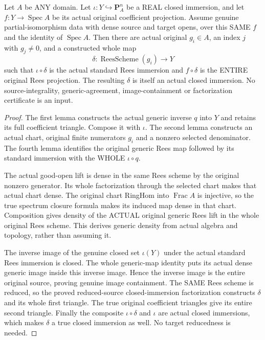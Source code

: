 \begin{theorem}
\label{scheme:actual-closed-projective-rees-domination}
Let $A$ be ANY domain. Let $\iota:Y\hookrightarrow\mathbf P^n_A$ be a REAL
closed immersion, and let $f:Y\to\operatorname{Spec}A$ be its actual original
coefficient projection. Assume genuine partial-isomorphism data with dense
source and target opens, over this SAME $f$ and the identity of
$\operatorname{Spec}A$. Then there are actual original $g_i\in A$, an index
$j$ with $g_j\ne0$, and a constructed whole map
\[
 \delta:\operatorname{ReesScheme}(g_i)\longrightarrow Y
\]
such that $\iota\circ\delta$ is the actual standard Rees immersion and
$f\circ\delta$ is the ENTIRE original Rees projection. The resulting
$\delta$ is itself an actual closed immersion. No source-integrality,
generic-agreement, image-containment or factorization certificate is an input.
\leanok
\end{theorem}
\begin{proof}
The first lemma constructs the actual generic inverse $q$ into $Y$ and retains
its full coefficient triangle. Compose it with $\iota$. The second lemma
constructs an actual chart, original finite numerators $g_i$ and a nonzero
selected denominator. The fourth lemma identifies the original generic Rees
map followed by its standard immersion with the WHOLE $\iota\circ q$.

The actual good-open lift is dense in the same Rees scheme by the original
nonzero generator. Its whole factorization through the selected chart makes
that actual chart dense. The original chart RingHom into $\operatorname{Frac}A$
is injective, so the true spectrum closure formula makes its induced map dense
in that chart. Composition gives density of the ACTUAL original generic Rees
lift in the whole original Rees scheme. This derives generic density from
actual algebra and topology, rather than assuming it.

The inverse image of the genuine closed set $\iota(Y)$ under the actual
standard Rees immersion is closed. The whole generic-map identity puts its
actual dense generic image inside this inverse image. Hence the inverse image
is the entire original source, proving genuine image containment. The SAME
Rees scheme is reduced, so the proved reduced-source closed-immersion
factorization constructs $\delta$ and its whole first triangle. The true
original coefficient triangles give its entire second triangle. Finally the
composite $\iota\circ\delta$ and $\iota$ are actual closed immersions, which
makes $\delta$ a true closed immersion as well. No target reducedness is needed.
\end{proof}

